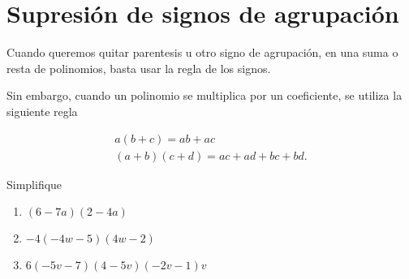 
\section{Supresi\'on de signos de agrupaci\'on}


	Cuando queremos quitar parentesis u otro signo de agrupaci\'on, en una suma o resta de polinomios, basta usar la regla de los signos.



	Sin embargo, cuando un polinomio se multiplica por un coeficiente, se utiliza la siguiente regla
	\begin{prop}
		\begin{eqnarray}
			\label{distribucion}
			a\left( b+c \right)=ab+ac\\
			\left( a+b \right)\left( c+d \right)=ac+ad+bc+bd.
		\end{eqnarray}
		
	\end{prop}
	



	\begin{problema} Simplifique
		\begin{enumerate}
			\item $(6-7a)(2-4a)$
			\item $-4(-4w-5)(4w-2)$
			\item $6(-5v-7)(4-5v)(-2v-1)v$
		\end{enumerate}	
	\end{problema}
	

